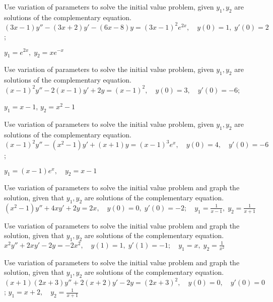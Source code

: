 \documentclass{ximera}
\begin{document}
\begin{problem}\label{exer:5.7.30}
Use variation
of parameters to solve the initial value problem, given
$y_1,y_2$ are solutions of the complementary equation. $(3x-1)y''-(3x+2)y'-(6x-8)y=(3x-1)^2e^{2x}, \quad   y(0)=1,\;
y'(0)=2$;

$y_1=e^{2x},\;  y_2=xe^{-x}$
\end{problem}

\begin{problem}\label{exer:5.7.31}
Use variation
of parameters to solve the initial value problem, given
$y_1,y_2$ are solutions of the complementary equation. $(x-1)^2y''-2(x-1)y'+2y=(x-1)^2, \quad   y(0)=3,\quad   y'(0)=-6$;

$y_1=x-1$,\;
$y_2=x^2-1$
\end{problem}

\begin{problem}\label{exer:5.7.32}
Use variation
of parameters to solve the initial value problem, given
$y_1,y_2$ are solutions of the complementary equation. $(x-1)^2y''-(x^2-1)y'+(x+1)y=(x-1)^3e^x, \quad  y(0)=4,\quad y'(0)=-6$;

$y_1=(x-1)e^x,\quad y_2=x-1$
\end{problem}

\begin{problem}\label{exer:5.7.33} Use variation
of parameters to solve the initial value problem and graph the
solution, given that $y_1,y_2$ are solutions of the complementary
equation.
$(x^2-1)y''+4xy'+2y=2x, \quad   y(0)=0,\;  y'(0)
=-2; \quad   y_1=\frac{1}{x-1},\;  y_2=\frac{1}{x+1}$
\end{problem}

\begin{problem}\label{exer:5.7.34} Use variation
of parameters to solve the initial value problem and graph the
solution, given that $y_1,y_2$ are solutions of the complementary
equation.
$x^2y''+2xy'-2y=-2x^2, \quad   y(1)=1,\;  y'(1)=
-1; \quad  y_1=x,\;  y_2=\frac{1}{x^2}$
\end{problem}

\begin{problem}\label{exer:5.7.35} Use variation
of parameters to solve the initial value problem and graph the
solution, given that $y_1,y_2$ are solutions of the complementary
equation.
$(x+1)(2x+3)y''+2(x+2)y'-2y=(2x+3)^2, \quad  y(0)=0,\quad y'(0)=0$;
\newline $y_1=x+2,\quad y_2=\frac{1}{x+1}$
\end{problem}
\end{document}
